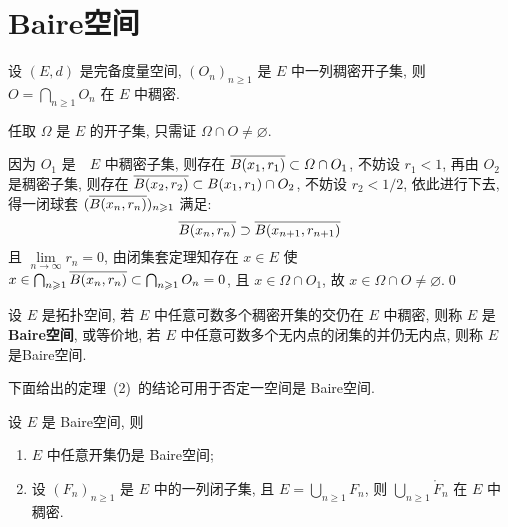 \section{Baire空间}
	\begin{Theorem}[Baire]
		设 $ (E, d) $ 是完备度量空间,  $ (O_{n})_{n\geqslant1} $ 是 $ E $ 中一列稠密开子集, 则 $ O=\bigcap_{n\geqslant1}O_{n} $ 在 $ E $ 中稠密.  
	\end{Theorem}
	\begin{Proof}
		任取 $ \varOmega $ 是 $ E $ 的开子集, 只需证 $ \varOmega\cap O\ne\varnothing $.

		因为 $ O_{1} $ 是　$ E $ 中稠密子集, 则存在 $ \baro{B(x_{1}, r_{1})}\subset \varOmega\cap O_{1} $, 不妨设 $ r_{1}<1 $, 再由 $ O_{2} $ 是稠密子集, 则存在 $ \baro{B(x_{2}, r_{2})}\subset B(x_{1}, r_{1})\cap O_{2} $, 不妨设 $ r_{2}<1/2 $, 依此进行下去, 得一闭球套 $ (\baro{B(x_{n}, r_{n})})_{n\geqslant1} $ 满足:
		\[
			\baro{B(x_{n}, r_{n})}\supset \baro{B(x_{n+1}, r_{n+1})}
		\]
		且 $ \lim\limits_{n\to\infty}r_{n}=0 $, 由闭集套定理知存在 $ x\in E $ 使 $ x\in\bigcap_{n\geqslant1}\baro{B(x_{n}, r_{n})}\subset\bigcap_{n\geqslant1}O_{n}=0 $, 且 $ x\in\varOmega\cap O_{1} $, 故 $ x\in\varOmega\cap O\ne\varnothing $.\qed
	\end{Proof}

	\begin{Definition}[Baire空间]\label{def:Baire空间}
		设 $ E $ 是拓扑空间, 若 $ E $ 中任意可数多个稠密开集的交仍在 $ E $ 中稠密, 则称 $ E $ 是\textbf{Baire空间}, 或等价地, 若 $ E $ 中任意可数多个无内点的闭集的并仍无内点, 则称 $ E $ 是Baire空间. 
	\end{Definition}

	下面给出的定理~(2)~的结论可用于否定一空间是 Baire空间. 
	\begin{Theorem}[Baire推论]
		设 $ E $ 是 Baire空间, 则
		\begin{enumerate}[(1)]
			\item $ E $ 中任意开集仍是 Baire空间;
			\item 设 $ (F_{n})_{n\geqslant1} $ 是 $ E $ 中的一列闭子集, 且 $ E = \bigcup_{n\geqslant1}F_{n} $, 则 $ \bigcup_{n\geqslant1}\mathring{F}_{n} $ 在 $ E $ 中稠密.
		\end{enumerate}
	\end{Theorem}

